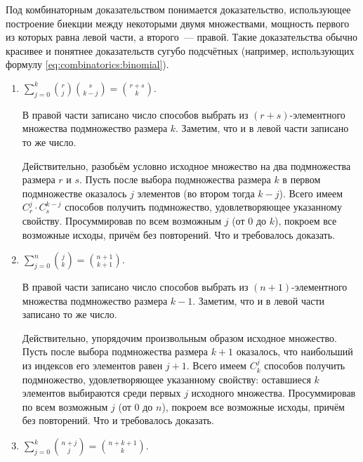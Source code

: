 \begin{Answer}
    \noindent
    Под комбинаторным доказательством понимается доказательство, использующее построение биекции
    между некоторыми двумя множествами, мощность первого из которых равна левой части, а второго~--- правой.
    Такие доказательства обычно красивее и понятнее доказательств сугубо подсчётных
    (например, использующих формулу \eqref{eq:combinatorics:binomial}).
    \begin{enumerate}
        \item
            $ \displaystyle \sum_{j=0}^k \binom{r}{j} \binom{s}{k-j} = \binom{r + s}{k} $.

            В правой части записано число способов выбрать из $ (r + s) $-элементного множества подмножество размера $ k $.
            Заметим, что и в левой части записано то же число.

            Действительно, разобьём условно исходное множество на два подмножества размера $ r $ и $ s $.
            Пусть после выбора подмножества размера $ k $ в первом подмножестве оказалось $ j $ элементов (во втором тогда $ k - j $).
            Всего имеем $ C_r^j \cdot C_s^{k-j} $ способов получить подмножество, удовлетворяющее указанному свойству.
            Просуммировав по всем возможным $ j $ (от $ 0 $ до $ k $), покроем все возможные исходы, причём без повторений.
            Что и требовалось доказать.
        \item
            $ \displaystyle \sum_{j=0}^n \binom{j}{k} = \binom{n+1}{k+1} $.

            В правой части записано число способов выбрать из $ (n+1) $-элементного множества подмножество размера $ k - 1 $.
            Заметим, что и в левой части записано то же число.

            Действительно, упорядочим произвольным образом исходное множество.
            Пусть после выбора подмножества размера $ k + 1 $ оказалось, что наибольший из индексов его элементов равен $ j + 1 $.
            Всего имеем $ C_k^j $ способов получить подмножество, удовлетворяющее указанному свойству:
            оставшиеся $ k $ элементов выбираются среди первых $ j $ исходного множества.
            Просуммировав по всем возможным $ j $ (от $ 0 $ до $ n $), покроем все возможные исходы, причём без повторений.
            Что и требовалось доказать.

        \item
            $ \displaystyle \sum_{j=0}^k \binom{n + j}{j} = \binom{n + k + 1}{k} $.


\end{enumerate}
\end{Answer}
